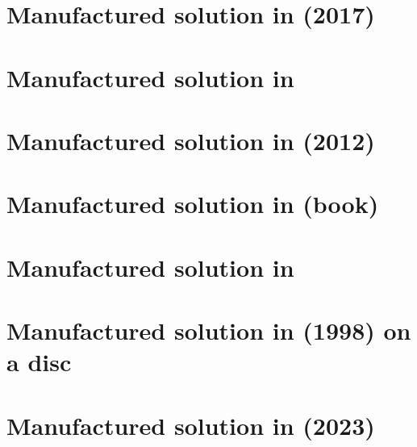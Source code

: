 \section{Manufactured solution in \textcite{lami17} (2017) \label{ss:mms11}}


\section{Manufactured solution in \textcite{muye17}} \label{ss:mms_muye17a}


\section{Manufactured solution in \textcite{bocg12} (2012)} \label{ss:mms_bocg12}


\section{Manufactured solution in \textcite{john16} (book)} \label{ss:mms_johnbook}


\section{Manufactured solution in \textcite{jokn16b}} \label{ss:mms_jokn16}


\section{Manufactured solution in \textcite{john98} (1998) on a disc} \label{ss:mms_john98}


\section{Manufactured solution in \textcite{bohm23} (2023)} \label{ss:mms_bohm23}


